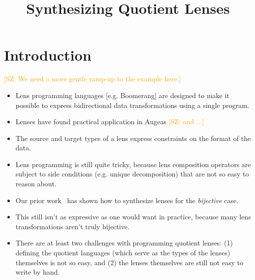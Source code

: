 \documentclass{svproc}
\newcommand{\FINISH}[3]{\ifdraft\textcolor{#1}{[#2: #3]}\fi}
\newcommand{\saz}[1]{\FINISH{orange}{SZ}{#1}}
\begin{document}
\mainmatter              %
%
\title{Synthesizing Quotient Lenses}
%
%
\author{}
%
\authorrunning{} %
%
\tocauthor{}
%
\institute{}

\maketitle              %

\begin{abstract}

\end{abstract}

\section{Introduction}
\saz{We need a more gentle ramp-up to the example here.}

\begin{itemize}
\item Lens programming languages [e.g. Boomerang] are designed to make it possible to express
  bidirectional data transformations using a single program.  

\item Lenses have found practical application in Augeas \saz{and ...}


\item The source and target types of a lens express constraints on the format of
  the data.

\item Lens programming is still quite tricky, because lens composition operators
  are subject to side conditions (e.g. unique decomposition) that are not so
  easy to reason about.

\item Our prior work~\cite{popl18} has shown how to synthesize lenses for the
  \textit{bijective} case.

\item This still isn't as expressive as one would want in practice, because many
  lens transformations aren't truly bijective.

\item There are at least two challenges with programming quotient lenses: (1)
  defining the quotient languages (which serve as the types of the lenses)
  themselves is not so easy, and (2) the lenses themselves are still not easy to
  write by hand.

\end{itemize}
\end{document}
